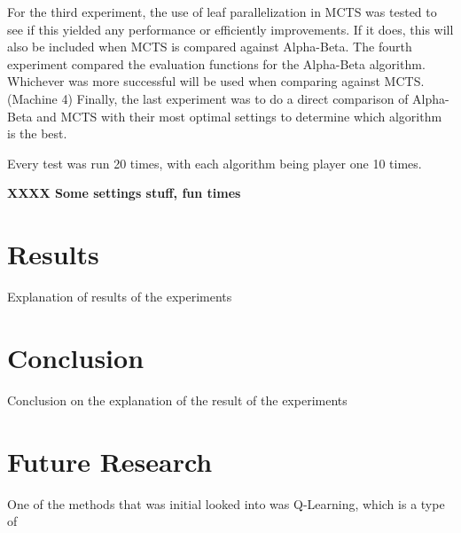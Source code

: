 \documentclass{ba-kecs}
\begin{document}
For the third experiment, the use of leaf parallelization in MCTS was tested to see if this yielded any performance or efficiently improvements. If it does, this will also be included when MCTS is compared against Alpha-Beta. The fourth experiment compared the evaluation functions for the Alpha-Beta algorithm. Whichever was more successful will be used when comparing against MCTS. (Machine 4) Finally, the last experiment was to do a direct comparison of Alpha-Beta and MCTS with their most optimal settings to determine which algorithm is the best.

Every test was run 20 times, with each algorithm being player one 10 times. 

\textbf{ XXXX Some settings stuff, fun times}
\section{Results}
Explanation of results of the experiments
\section{Conclusion}
Conclusion on the explanation of the result of the experiments
\section{Future Research}
One of the methods that was initial looked into was Q-Learning, which is a type of 


\end{document}
